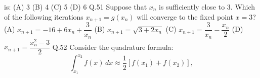 \documentclass{article}
\begin{document}
																																																																																																		      is:
																																																																																																		       \newline
																																																																																																		       (A) 3 \hspace{2cm}(B) 4 \hspace{2cm} (C) 5 \hspace{2cm} (D) 6
																																																																																																		       \vspace{1em}
																																																																																																		       \newline
																																																																																																		       Q.51 \quad Suppose that $x_n$ is sufficiently close to 3. Which of the following iterations $x_{n+1} = g(x_n)$ will converge to the fixed point $x = 3$?
																																																																																																		          \vspace{1em}  \newline
																																																																																																			  \noindent (A)  $x_{n+1} = -16 + 6x_n + \dfrac{3}{x_n}$ \hspace{4cm} (B)  $x_{n+1} = \sqrt{3 + 2x_n}$
																																																																																																			  \newline \noindent (C)  $x_{n+1} = \dfrac{3}{x_n} - \dfrac{x_n}{2}$ \hspace{5cm}  (D) $x_{n+1} = \dfrac{x_n^2 - 3}{2}$
																																																																																																			  \vspace{1em}
																																																																																																			  \newline
																																																																																																			  Q.52 \quad Consider the quadrature formula:
																																																																																																			      \[
																																																																																																			          \int_{x_1}^{x_2} f(x)\, dx \approx \dfrac{1}{2} \left[f(x_1) + f(x_2)\right],
																																																																																																				      \]
\end{document}
